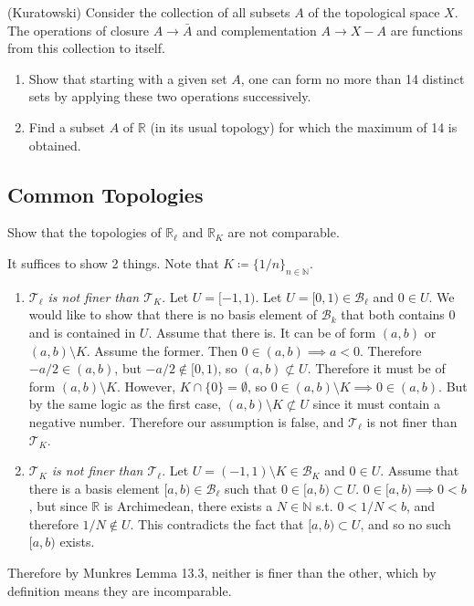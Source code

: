   \begin{exercise}[Munkres 17.21]
    (Kuratowski) Consider the collection of all subsets $A$ of the topological space $X$. The operations of closure $A \to \bar{A}$ and complementation $A \to X - A$ are functions from this collection to itself.
    \begin{enumerate}
      \item Show that starting with a given set $A$, one can form no more than 14 distinct sets by applying these two operations successively.
      \item Find a subset $A$ of $\mathbb{R}$ (in its usual topology) for which the maximum of 14 is obtained.
    \end{enumerate}
  \end{exercise}
  \begin{solution}
    
  \end{solution}

\subsection{Common Topologies}

  \begin{exercise}[Munkres 13.6]
    Show that the topologies of $\mathbb{R}_\ell$ and $\mathbb{R}_K$ are not comparable.
  \end{exercise}
  \begin{solution}[Munkres 13.6]
    It suffices to show 2 things. Note that $K \coloneqq \{ 1/n \}_{n \in \mathbb{N}}$. 
    \begin{enumerate}
      \item \textit{$\mathcal{T}_\ell$ is not finer than $\mathcal{T}_K$}. Let $U = [-1, 1)$. Let $U = [0, 1) \in \mathscr{B}_\ell$ and $0 \in U$. We would like to show that there is no basis element of $\mathscr{B}_k$ that both contains $0$ and is contained in $U$. Assume that there is. It can be of form $(a, b)$ or $(a, b) \setminus K$. Assume the former. Then $0 \in (a, b) \implies a < 0$. Therefore $-a/2 \in (a, b)$, but $-a/2 \not\in [0, 1)$, so $(a, b) \not\subset U$. Therefore it must be of form $(a, b) \setminus K$. However, $K \cap \{0\} = \emptyset$, so $0 \in (a, b) \setminus K \implies 0 \in (a, b)$. But by the same logic as the first case, $(a, b) \setminus K \not\subset U$ since it must contain a negative number. Therefore our assumption is false, and $\mathcal{T}_{\ell}$ is not finer than $\mathcal{T}_K$. 
      \item \textit{$\mathcal{T}_K$ is not finer than $\mathcal{T}_\ell$}. Let $U = (-1, 1) \setminus K \in \mathscr{B}_K$ and $0 \in U$. Assume that there is a basis element $[a, b) \in \mathscr{B}_\ell$ such that $0 \in [a, b) \subset U$. $0 \in [a, b) \implies 0 < b$, but since $\mathbb{R}$ is Archimedean, there exists a $N \in \mathbb{N}$ s.t. $0 < 1/N < b$, and therefore $1/N \not\in U$. This contradicts the fact that $[a, b) \subset U$, and so no such $[a, b)$ exists. 
    \end{enumerate}
    Therefore by Munkres Lemma 13.3, neither is finer than the other, which by definition means they are incomparable. 
  \end{solution}



